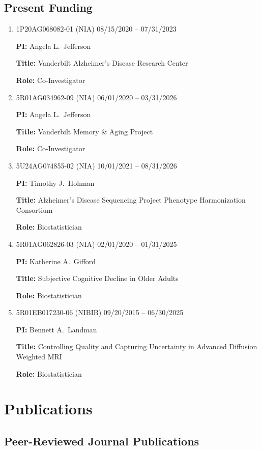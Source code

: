 \documentclass[12pt]{article}
\begin{document}
	\subsection*{Present Funding}
	\begin{enumerate}
		\item 1P20AG068082-01 (NIA) \hfill 08/15/2020 -- 07/31/2023
		
		{\bf PI:} Angela L.\ Jefferson
		
		{\bf Title:} Vanderbilt Alzheimer's Disease Research Center
		
		{\bf Role:} Co-Investigator
		
		\item 5R01AG034962-09 (NIA) \hfill 06/01/2020 -- 03/31/2026
		
		{\bf PI:} Angela L.\ Jefferson
		
		{\bf Title:} Vanderbilt Memory \& Aging Project
		
		{\bf Role:} Co-Investigator
		\item 5U24AG074855-02 (NIA) \hfill 10/01/2021 -- 08/31/2026
		
		{\bf PI:} Timothy J.\ Hohman
		
		{\bf Title:} Alzheimer's Disease Sequencing Project Phenotype Harmonization Consortium
		
		{\bf Role:} Biostatistician
		\item 5R01AG062826-03 (NIA) \hfill 02/01/2020 -- 01/31/2025
		
		{\bf PI:} Katherine A.\ Gifford
		
		{\bf Title:} Subjective Cognitive Decline in Older Adults
		
		{\bf Role:} Biostatistician
		
		\item 5R01EB017230-06 (NIBIB) \hfill 09/20/2015 -- 06/30/2025
		
		{\bf PI:} Bennett A.\ Landman
		
		{\bf Title:} Controlling Quality and Capturing Uncertainty 
		in Advanced Diffusion Weighted MRI
		
		{\bf Role:} Biostatistician
	\end{enumerate}
	
	\section*{Publications}
	\subsection*{Peer-Reviewed Journal Publications}
	
\end{document}
